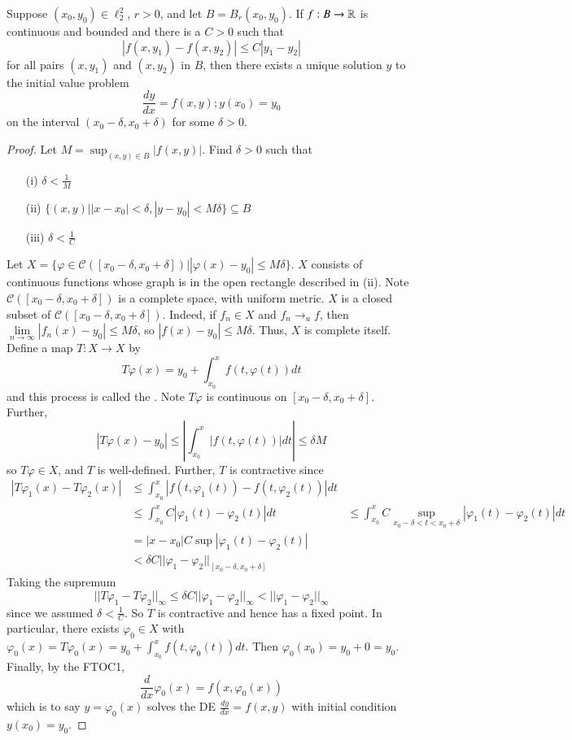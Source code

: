 \begin{thm}
    Suppose $(x_0,y_0) \in \ell_2^2$, $r > 0$, and let $B = B_r(x_0,y_0)$. If $f:B\rightarrow \mathbb R$ is continuous and bounded and there is a $C > 0$ such that $$|f(x,y_1)-f(x,y_2)| \leq C|y_1-y_2|$$ for all pairs $(x,y_1)$ and $(x,y_2)$ in $B$, then there exists a unique solution $y$ to the initial value problem $$\frac{dy}{dx} = f(x,y); y(x_0) = y_0$$ on the interval $(x_0 - \delta,x_0+\delta)$ for some $\delta > 0$.
\end{thm}
\begin{proof}
    Let $M = \sup_{(x,y) \in B}|f(x,y)|$. Find $\delta > 0$ such that \begin{itemize}
        \item[(i)] $\delta < \frac{1}{M}$
        \item[(ii)] $\{(x,y)\vert |x-x_0| < \delta, |y-y_0| <M\delta\} \subseteq B$
        \item[(iii)] $\delta < \frac{1}{C}$
    \end{itemize}
    Let $X = \{\varphi \in \mathcal{C}([x_0-\delta,x_0+\delta])\vert |\varphi(x)-y_0| \leq M\delta\}$. $X$ consists of continuous functions whose graph is in the open rectangle described in (ii). Note $\mathcal{C}([x_0-\delta,x_0+\delta])$ is a complete space, with uniform metric. $X$ is a closed subset of $\mathcal{C}([x_0-\delta,x_0+\delta])$. Indeed, if $f_n \in X$ and $f_n\rightarrow_u f$, then $\lim\limits_{n\rightarrow\infty}|f_n(x)-y_0| \leq M\delta$, so $|f(x) - y_0| \leq M\delta$. Thus, $X$ is complete itself. Define a map $T:X\rightarrow X$ by $$T\varphi(x) = y_0 + \int_{x_0}^xf(t,\varphi(t))dt$$ and this process is called the . Note $T\varphi$ is continuous on $[x_0-\delta,x_0+\delta]$. Further, $$|T\varphi(x) - y_0| \leq \left|\int_{x_0}^x|f(t,\varphi(t))|dt\right| \leq \delta M$$ so $T\varphi \in X$, and $T$ is well-defined. Further, $T$ is contractive since \begin{align*}
        |T\varphi_1(x) - T\varphi_2(x)|&\leq \int_{x_0}^x|f(t,\varphi_1(t)) - f(t,\varphi_2(t))|dt \\
        &\leq \int_{x_0}^x C|\varphi_1(t) - \varphi_2(t)|dt
        &\leq \int_{x_0}^xC\sup_{x_0-\delta < t < x_0+\delta}|\varphi_1(t) - \varphi_2(t)| dt \\
        &= |x-x_0|C\sup|\varphi_1(t) - \varphi_2(t)| \\
        &< \delta C||\varphi_1-\varphi_2||_{[x_0-\delta,x_0+\delta]} 
    \end{align*}
    Taking the supremum $$||T\varphi_1 - T\varphi_2||_{\infty} \leq \delta C||\varphi_1-\varphi_2||_{\infty} < ||\varphi_1-\varphi_2||_{\infty}$$ since we assumed $\delta < \frac{1}{C}$. So $T$ is contractive and hence has a fixed point. In particular, there exists $\varphi_0 \in X$ with $\varphi_0(x) = T\varphi_0(x) = y_0+\int_{x_0}^xf(t,\varphi_0(t))dt$. Then $\varphi_0(x_0) = y_0 + 0 = y_0$. Finally, by the FTOC1, $$\frac{d}{dx}\varphi_0(x) = f(x,\varphi_0(x))$$ which is to say $y = \varphi_0(x)$ solves the DE $\frac{dy}{dx} = f(x,y)$ with initial condition $y(x_0) = y_0$.
\end{proof}



